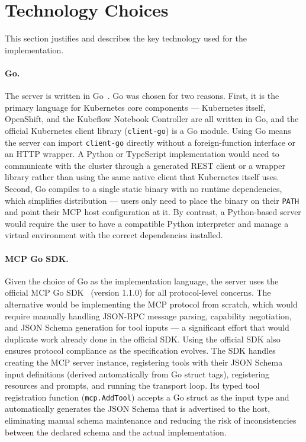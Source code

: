 \documentclass[
  digital,     %
  oneside,     %
  nosansbold,  %
  nocolorbold, %
  lof,         %
  lot,         %
]{fithesis4}
\begin{document}
\section{Technology Choices}
\label{sec:technologies}

This section justifies and describes the key technology used for the
implementation.

\paragraph{Go.}
The server is written in Go~\parencite{go-lang}. Go was chosen for two
reasons. First, it is the primary language for Kubernetes core components ---
Kubernetes itself, OpenShift, and the Kubeflow Notebook Controller are all
written in Go, and the official Kubernetes client library
(\texttt{client-go}) is a Go module. Using Go means the server can import
\texttt{client-go} directly without a foreign-function interface or an
HTTP wrapper. A Python or TypeScript implementation would need to
communicate with the cluster through a generated REST client or a wrapper
library rather than using the same native client that Kubernetes itself
uses. Second, Go compiles to a single static binary with no runtime
dependencies, which simplifies distribution --- users only need to place
the binary on their \texttt{PATH} and point their MCP host configuration at
it. By contrast, a Python-based server would require the user to have a
compatible Python interpreter and manage a virtual environment with the
correct dependencies installed.

\paragraph{MCP Go SDK.}
Given the choice of Go as the implementation language, the server uses the
official MCP Go SDK~\parencite{mcp-go-sdk} (version 1.1.0) for all
protocol-level concerns. The alternative would be implementing the MCP
protocol from scratch, which would require manually handling JSON-RPC
message parsing, capability negotiation, and JSON Schema generation for
tool inputs --- a significant effort that would duplicate work already done
in the official SDK. Using the official SDK also ensures protocol compliance as the
specification evolves. The SDK handles creating the MCP server instance,
registering tools with their JSON Schema input definitions (derived
automatically from Go struct tags), registering resources and prompts, and
running the transport loop. Its typed tool registration function
(\texttt{mcp.AddTool}) accepts a Go struct as the input type and
automatically generates the JSON Schema that is advertised to the host,
eliminating manual schema maintenance and reducing the risk of
inconsistencies between the declared schema and the actual implementation.
\end{document}
